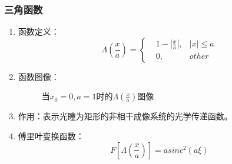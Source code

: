 \documentclass[twocolumn]{ctexart}
\begin{document}
\subsubsection{三角函数}
\begin{enumerate}
    \item
          函数定义：
          \begin{equation}
              \Lambda\left(\frac{x}{a}\right)=\left\{
              \begin{aligned}
                   & 1-\left\lvert\frac{x}{a}\right\rvert, & \left\lvert x \right\lvert \leqslant a \\
                   & 0,                                    & other
              \end{aligned}
              \right.
              \nonumber
          \end{equation}
    \item
          函数图像：
          \begin{figure}[H]
              \caption{当$x_0=0,a=1$时的$\Lambda\left(\frac{x}{a}\right)$图像}
          \end{figure}
    \item
          作用：表示光瞳为矩形的非相干成像系统的光学传递函数。
    \item
          傅里叶变换函数：
          \begin{equation}
              F\left[ \Lambda\left(\frac{x}{a}\right) \right]=asinc^2(a\xi)
              \nonumber
          \end{equation}
\end{enumerate}
\end{document}
